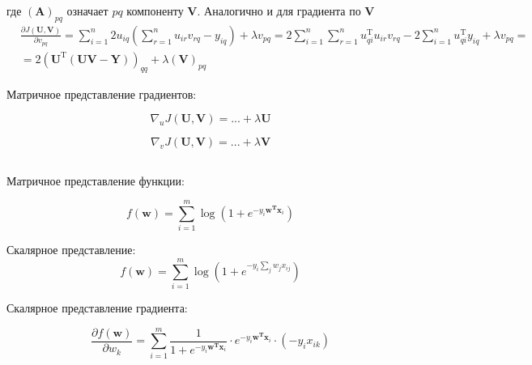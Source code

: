 	где $(\mathbf{A})_{pq}$ означает $pq$ компоненту $\mathbf{V}$. Аналогично и для
	градиента по $\mathbf{V}$
	\begin{equation}
	\begin{split}
	&\frac{\partial J(\mathbf{U}, \mathbf{V})}{\partial v_{pq}} =
	\sum\limits_{i=1}^{n}2u_{iq} (\sum\limits_{r=1}^{n}u_{ir}v_{rq}-y_{iq}) +
	\lambda v_{pq} = 2\sum\limits_{i=1}^{n} \sum\limits_{r=1}^{n} u_{qi}^\text{T}
	u_{ir}v_{rq}- 2\sum\limits_{i=1}^{n} u_{qi}^\text{T} y_{iq} + \lambda v_{pq} =
	\\
	&= 2 (\mathbf{U}^\text{T} (\mathbf{U}\mathbf{V} - \mathbf{Y}))_{qq} + \lambda
	(\mathbf{V})_{pq}  
	\end{split}
	\end{equation}
	
	Матричное представление градиентов:
	
	
	\begin{equation}
	\nabla_u J(\mathbf{U}, \mathbf{V}) = ... + \lambda \mathbf{U}
	\end{equation}
	
	
	\begin{equation}
	\nabla_v J(\mathbf{U}, \mathbf{V}) = ...+ \lambda \mathbf{V}
	\end{equation}
	
	\subsection{}
	
	
	Матричное представление функции:
	
	\begin{equation}
	f(\mathbf{w}) = \sum\limits_{i=1}^m \log (1+ e^{-y_i \mathbf{w^T x}_i})
	\end{equation}
	
	Скалярное представление:	
	\begin{equation}
	f(\mathbf{w}) = \sum\limits_{i=1}^m \log (1+ e^{-y_i \sum_j w_j x_{ij}})
	\end{equation}
	
	Скалярное представление градиента:
	
	\begin{equation}
	\frac{\partial f(\mathbf{w})}{\partial w_k} = \sum\limits_{i=1}^m  \frac{1}{1+
		e^{-y_i \mathbf{w^T x}_i}} \cdot e^{-y_i \mathbf{w^T x}_i} \cdot (-y_i x_{ik})
	\end{equation}
	
